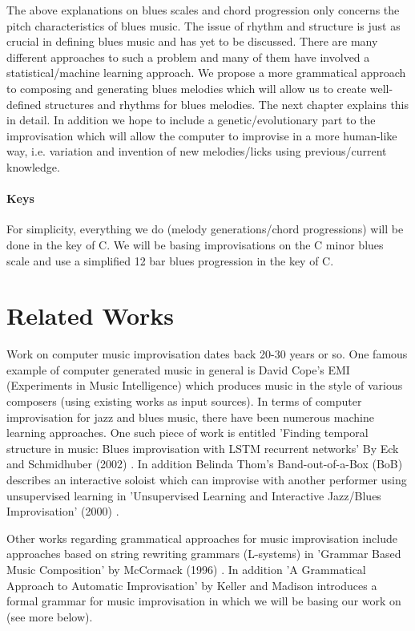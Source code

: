 \documentclass[pdftex,12pt,a4paper]{report}
\begin{document}
The above explanations on blues scales and chord progression only concerns the pitch characteristics of blues music. The issue of rhythm and structure is just as crucial in defining blues music and has yet to be discussed. There are many different approaches to such a problem and many of them have involved a statistical/machine learning approach. We propose a more grammatical approach to composing and generating blues melodies which will allow us to create well-defined structures and rhythms for blues melodies. The next chapter explains this in detail. In addition we hope to include a genetic/evolutionary part to the improvisation which will allow the computer to improvise in a more human-like way, i.e. variation and invention of new melodies/licks using previous/current knowledge.

\paragraph{Keys}
For simplicity, everything we do (melody generations/chord progressions) will be done in the key of C. We will be basing improvisations on the C minor blues scale and use a simplified 12 bar blues progression in the key of C.

\section{Related Works}
Work on computer music improvisation dates back 20-30 years or so. One famous example of computer generated music in general is David Cope's EMI (Experiments in Music Intelligence) which produces music in the style of various composers (using existing works as input sources). In terms of computer improvisation for jazz and blues music, there have been numerous machine learning approaches. One such piece of work is entitled 'Finding temporal structure in music: Blues improvisation with LSTM recurrent networks' By Eck and Schmidhuber (2002) \cite{eck02}. In addition Belinda Thom's Band-out-of-a-Box (BoB) describes an interactive soloist which can improvise with another performer using unsupervised learning in 'Unsupervised Learning and Interactive Jazz/Blues Improvisation' (2000) \cite{thom2000}.

Other works regarding grammatical approaches for music improvisation include approaches based on string rewriting grammars (L-systems) in 'Grammar Based Music Composition' by McCormack (1996) \cite{mccormack96}. In addition 'A Grammatical Approach to Automatic Improvisation' by Keller and Madison \cite{keller07} introduces a formal grammar for music improvisation in which we will be basing our work on (see more below).
\end{document}
